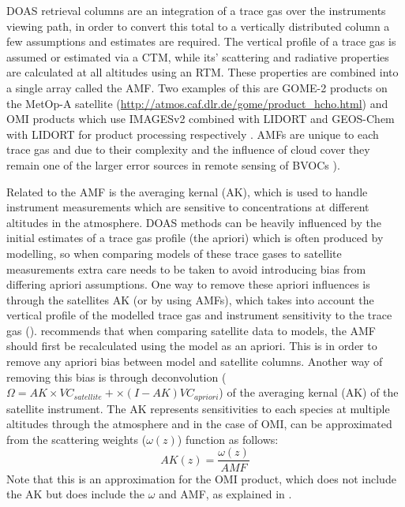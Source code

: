      DOAS retrieval columns are an integration of a trace gas over the instruments viewing path, in order to convert this total to a vertically distributed column a few assumptions and estimates are required. 
      The vertical profile of a trace gas is assumed or estimated via a CTM, while its' scattering and radiative properties are calculated at all altitudes using an RTM. 
      These properties are combined into a single array called the AMF.
      Two examples of this are GOME-2 products on the MetOp-A satellite (\url{http://atmos.caf.dlr.de/gome/product_hcho.html}) and OMI products which use IMAGESv2 combined with LIDORT and GEOS-Chem with LIDORT for product processing respectively \parencite{Chance2002, Abad2015}.
      AMFs are unique to each trace gas and due to their complexity and the influence of cloud cover they remain one of the larger error sources in remote sensing of BVOCs \parencite{Palmer2001,Millet2006}).
      
      Related to the AMF is the averaging kernal (AK), which is used to handle instrument measurements which are sensitive to concentrations at different altitudes in the atmosphere.
      DOAS methods can be heavily influenced by the initial estimates of a trace gas profile (the apriori) which is often produced by modelling, so when comparing models of these trace gases to satellite measurements extra care needs to be taken to avoid introducing bias from differing apriori assumptions.
      One way to remove these apriori influences is through the satellites AK (or by using AMFs), which takes into account the vertical profile of the modelled trace gas and instrument sensitivity to the trace gas (\textcite{Eskes2003, Palmer2001}).
      \textcite{Lamsal2014} recommends that when comparing satellite data to models, the AMF should first be recalculated using the model as an apriori.
      This is in order to remove any apriori bias between model and satellite columns.
      Another way of removing this bias is through deconvolution ($\Omega = AK \times VC_{satellite} + \times (I - AK) VC_{apriori}$) of the averaging kernal (AK) of the satellite instrument.
      The AK represents sensitivities to each species at multiple altitudes through the atmosphere and in the case of OMI, can be approximated from the scattering weights ($\omega(z)$) function as follows:
      \begin{equation} \label{ch_HCHO:eqn:AKfromw}
      AK(z) = \frac{\omega(z)}{AMF}
      \end{equation}
      Note that this is an approximation for the OMI product, which does not include the AK but does include the $\omega$ and AMF, as explained in \citet{Abad2015}.
      
